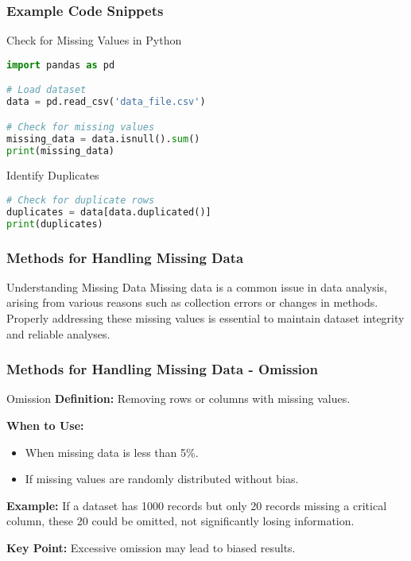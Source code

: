 \documentclass[aspectratio=169]{beamer}
\begin{document}
\begin{frame}[fragile]
    \frametitle{Example Code Snippets}
    \begin{block}{Check for Missing Values in Python}
        \begin{lstlisting}[language=Python]
import pandas as pd

# Load dataset
data = pd.read_csv('data_file.csv')

# Check for missing values
missing_data = data.isnull().sum()
print(missing_data)
        \end{lstlisting}
    \end{block}

    \begin{block}{Identify Duplicates}
        \begin{lstlisting}[language=Python]
# Check for duplicate rows
duplicates = data[data.duplicated()]
print(duplicates)
        \end{lstlisting}
    \end{block}
\end{frame}

\begin{frame}[fragile]
    \frametitle{Methods for Handling Missing Data}
    \begin{block}{Understanding Missing Data}
        Missing data is a common issue in data analysis, arising from various reasons such as collection errors or changes in methods. Properly addressing these missing values is essential to maintain dataset integrity and reliable analyses.
    \end{block}
\end{frame}

\begin{frame}[fragile]
    \frametitle{Methods for Handling Missing Data - Omission}
    \begin{block}{Omission}
        \textbf{Definition:} Removing rows or columns with missing values.
        
        \textbf{When to Use:}
        \begin{itemize}
            \item When missing data is less than 5\%.
            \item If missing values are randomly distributed without bias.
        \end{itemize}
        
        \textbf{Example:} 
        If a dataset has 1000 records but only 20 records missing a critical column, these 20 could be omitted, not significantly losing information.
        
        \textbf{Key Point:} Excessive omission may lead to biased results.
    \end{block}
\end{frame}
\end{document}
